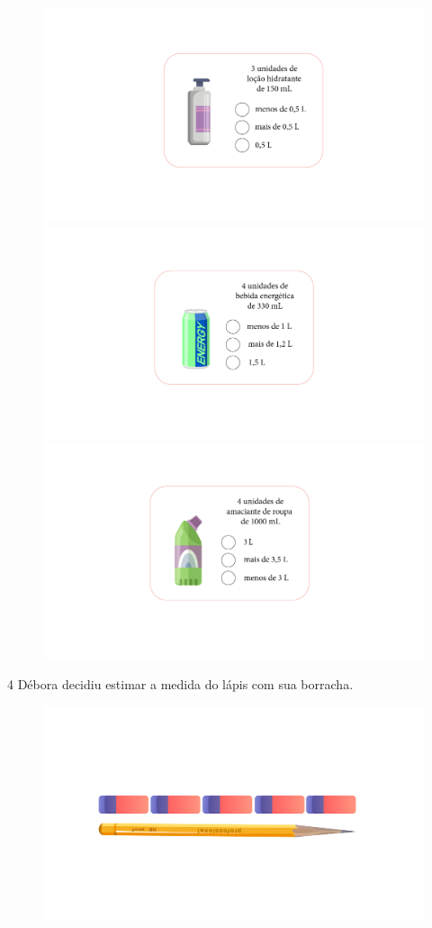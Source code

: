 \begin{figure}[htpb!]
\includegraphics[width=.3\textwidth]{../ilustracoes/MAT5/SAEB_5ANO_MAT_figura31b.png}
\includegraphics[width=.3\textwidth]{../ilustracoes/MAT5/SAEB_5ANO_MAT_figura31c.png}
\includegraphics[width=.3\textwidth]{../ilustracoes/MAT5/SAEB_5ANO_MAT_figura31d.png}
\end{figure}



\num{4} Débora decidiu estimar a medida do lápis com sua borracha.

\begin{figure}[htpb!]
\includegraphics[width=\textwidth]{../ilustracoes/MAT5/SAEB_5ANO_MAT_figura32.png}
\end{figure}

